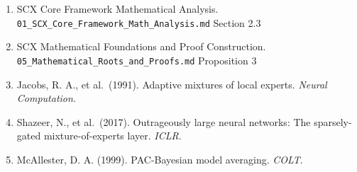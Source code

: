 \documentclass[
  12pt,
]{article}
\providecommand{\tightlist}{%
  \setlength{\itemsep}{0pt}\setlength{\parskip}{0pt}}
\begin{document}
\begin{enumerate}
\def\labelenumi{\arabic{enumi}.}
\tightlist
\item
  SCX Core Framework Mathematical Analysis. \texttt{01\_SCX\_Core\_Framework\_Math\_Analysis.md} Section
  2.3
\item
  SCX Mathematical Foundations and Proof Construction. \texttt{05\_Mathematical\_Roots\_and\_Proofs.md} Proposition 3
\item
  Jacobs, R. A., et al.~(1991). Adaptive mixtures of local experts.
  \emph{Neural Computation}.
\item
  Shazeer, N., et al.~(2017). Outrageously large neural networks: The
  sparsely-gated mixture-of-experts layer. \emph{ICLR}.
\item
  McAllester, D. A. (1999). PAC-Bayesian model averaging. \emph{COLT}.
\end{enumerate}
\end{document}
